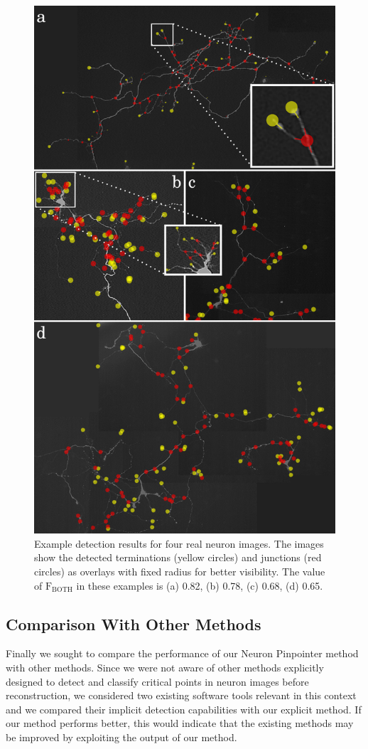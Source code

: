 \begin{figure}[!t]
	\centering
	\includegraphics[width=0.5\columnwidth]{det_real}
	\caption{Example detection results for four real neuron images. The images show the detected terminations (yellow circles) and junctions (red circles) as overlays with fixed radius for better visibility. The value of $\textrm{F}_\textrm{BOTH}$ in these examples is (a) 0.82, (b) 0.78, (c) 0.68, (d) 0.65.}
	\label{fig:real-det}
\end{figure}

\subsection{Comparison With Other Methods}%
\label{subsec:comparison}
Finally we sought to compare the performance of our Neuron Pinpointer method with other methods. Since we were not aware of other methods explicitly designed to detect and classify critical points in neuron images before reconstruction, we considered two existing software tools relevant in this context and we compared their implicit detection capabilities with our explicit method. If our method performs better, this would indicate that the existing methods may be improved by exploiting the output of our method.

